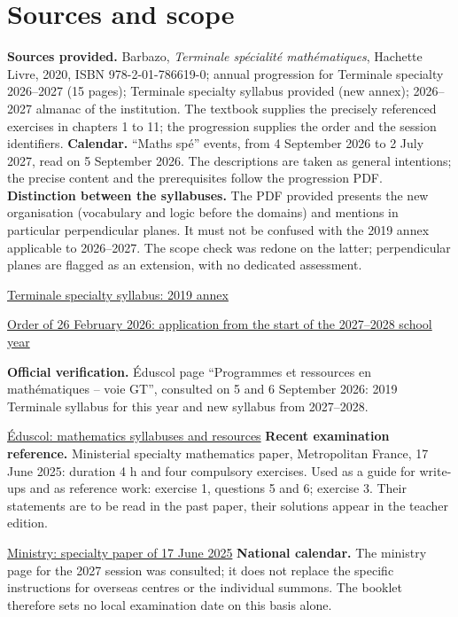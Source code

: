 \chapter{Sources and scope}
\textbf{Sources provided.} Barbazo, \emph{Terminale spécialité mathématiques}, Hachette Livre, 2020, ISBN 978-2-01-786619-0; annual progression for Terminale specialty 2026--2027 (15 pages); Terminale specialty syllabus provided (new annex); 2026--2027 almanac of the institution. The textbook supplies the precisely referenced exercises in chapters 1 to 11; the progression supplies the order and the session identifiers.
\textbf{Calendar.} ``Maths spé'' events, from 4 September 2026 to 2 July 2027, read on 5 September 2026. The descriptions are taken as general intentions; the precise content and the prerequisites follow the progression PDF.
\textbf{Distinction between the syllabuses.} The PDF provided presents the new organisation (vocabulary and logic before the domains) and mentions in particular perpendicular planes. It must not be confused with the 2019 annex applicable to 2026--2027. The scope check was redone on the latter; perpendicular planes are flagged as an extension, with no dedicated assessment.\par
\href{https://eduscol.education.gouv.fr/sites/default/files/document/spe246annexe1158907pdf-84159.pdf}{Terminale specialty syllabus: 2019 annex}\par
\href{https://www.education.gouv.fr/bo/2026/Hebdo14/MENE2602919A}{Order of 26 February 2026: application from the start of the 2027--2028 school year}\par
\textbf{Official verification.} Éduscol page ``Programmes et ressources en mathématiques -- voie GT'', consulted on 5 and 6 September 2026: 2019 Terminale syllabus for this year and new syllabus from 2027--2028.\par
\href{https://eduscol.education.gouv.fr/5817/programmes-et-ressources-en-mathematiques-voie-gt}{Éduscol: mathematics syllabuses and resources}
\textbf{Recent examination reference.} Ministerial specialty mathematics paper, Metropolitan France, 17 June 2025: duration 4 h and four compulsory exercises. Used as a guide for write-ups and as reference work: exercise 1, questions 5 and 6; exercise 3. Their statements are to be read in the past paper, their solutions appear in the teacher edition.\par
\href{https://www.education.gouv.fr/sites/default/files/2025-06/baccalaur-at-g-n-ral-2025-math-matiques-440856.pdf}{Ministry: specialty paper of 17 June 2025}
\textbf{National calendar.} The ministry page for the 2027 session was consulted; it does not replace the specific instructions for overseas centres or the individual summons. The booklet therefore sets no local examination date on this basis alone.\par
